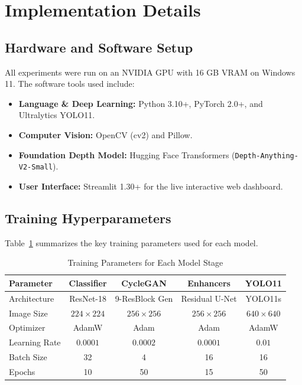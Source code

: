 \documentclass{article}
\begin{document}
\section{Implementation Details}
\label{sec:implementation}

\subsection{Hardware and Software Setup}
All experiments were run on an NVIDIA GPU with 16 GB VRAM on Windows 11. The software tools used include:
\begin{itemize}
    \item \textbf{Language \& Deep Learning:} Python 3.10+, PyTorch 2.0+, and Ultralytics YOLO11.
    \item \textbf{Computer Vision:} OpenCV (cv2) and Pillow.
    \item \textbf{Foundation Depth Model:} Hugging Face Transformers (\texttt{Depth-Anything-V2-Small}).
    \item \textbf{User Interface:} Streamlit 1.30+ for the live interactive web dashboard.
\end{itemize}

\subsection{Training Hyperparameters}
Table~\ref{tab:hyperparameters} summarizes the key training parameters used for each model.

\begin{table}[!ht]
\centering
\small
\caption{Training Parameters for Each Model Stage}
\label{tab:hyperparameters}
\begin{tabular}{lcccc}
\toprule
\textbf{Parameter} & \textbf{Classifier} & \textbf{CycleGAN} & \textbf{Enhancers} & \textbf{YOLO11} \\
\midrule
Architecture & ResNet-18 & 9-ResBlock Gen & Residual U-Net & YOLO11s \\
Image Size & $224 \times 224$ & $256 \times 256$ & $256 \times 256$ & $640 \times 640$ \\
Optimizer & AdamW & Adam & Adam & AdamW \\
Learning Rate & $0.0001$ & $0.0002$ & $0.0001$ & $0.01$ \\
Batch Size & 32 & 4 & 16 & 16 \\
Epochs & 10 & 50 & 15 & 50 \\
\bottomrule
\end{tabular}
\end{table}
\end{document}
